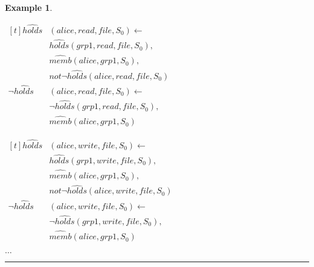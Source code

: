 \documentclass[11pt, twocolumn]{article}
\newtheorem{vexmpl}{Example}
\newenvironment{vexample}
  {\begin{vexmpl}\rm}
  {\rule{2mm}{2mm}\end{vexmpl}}
\begin{document}
\begin{vexample}
\begin{enumerate}
              \begin{math}
                \begin{aligned}[t]
                  \hat{holds}&(alice, read, file, S_{0}) \leftarrow \\
                  & \hat{holds}(grp1, read, file, S_{0}), \\
                  & \hat{memb}(alice, grp1, S_{0}), \\
                  & not \lnot \hat{holds}(alice, read, file, S_{0}) \\
                  \lnot \hat{holds}&(alice, read, file, S_{0}) \leftarrow \\
                  & \lnot \hat{holds}(grp1, read, file, S_{0}), \\
                  & \hat{memb}(alice, grp1, S_{0})
                \end{aligned}
              \end{math}

              \begin{math}
                \begin{aligned}[t]
                  \hat{holds}&(alice, write, file, S_{0}) \leftarrow \\
                  & \hat{holds}(grp1, write, file, S_{0}), \\
                  & \hat{memb}(alice, grp1, S_{0}), \\
                  & not \lnot \hat{holds}(alice, write, file, S_{0}) \\
                  \lnot \hat{holds}&(alice, write, file, S_{0}) \leftarrow \\
                  & \lnot \hat{holds}(grp1, write, file, S_{0}), \\
                  & \hat{memb}(alice, grp1, S_{0})
                \end{aligned}
              \end{math}

              $\ldots$


\end{enumerate}
\end{vexample}
\end{document}
